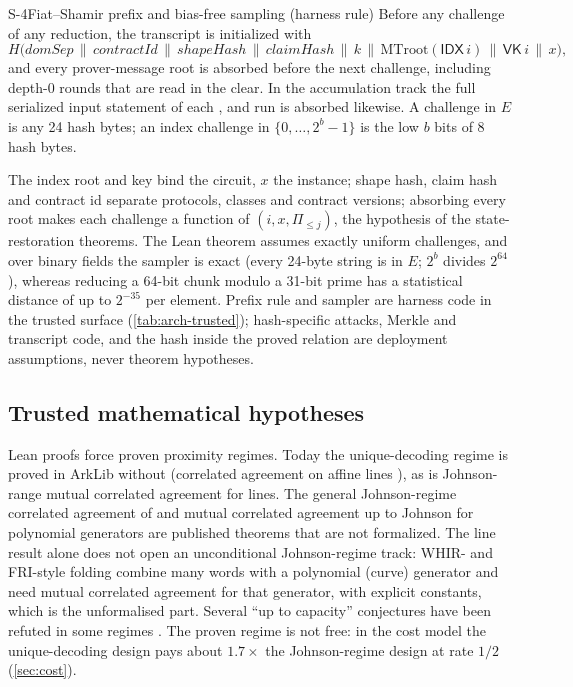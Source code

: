 \begin{decision}{S-4}{Fiat--Shamir prefix and bias-free sampling (harness rule)}
Before any challenge of any reduction, the transcript is initialized with
\[ H\bigl(\mathit{domSep}\,\|\,\mathit{contractId}\,\|\,\mathit{shapeHash}\,\|\,\mathit{claimHash}\,\|\,
   k\,\|\,\mathrm{MTroot}(\mathsf{IDX}\,i)\,\|\,\mathsf{VK}\,i\,\|\,x\bigr), \]
and every prover-message root is absorbed before the next challenge, including depth-0 rounds that
are read in the clear. In the accumulation track the full serialized input statement of each
,  and  run is absorbed likewise. A challenge in $E$ is any
24 hash bytes; an index challenge in $\{0,\dots,2^b-1\}$ is the low $b$ bits of 8 hash bytes.
\end{decision}

\noindent The index root and key bind the circuit, $x$ the instance; shape hash, claim hash and
contract id separate protocols, classes and contract versions; absorbing every root makes each
challenge a function of $(i,x,\Pi_{\le j})$, the hypothesis of the state-restoration theorems. The
Lean theorem assumes exactly uniform challenges, and over binary fields the sampler is exact (every
24-byte string is in $E$; $2^b$ divides $2^{64}$), whereas reducing a 64-bit chunk modulo a 31-bit
prime has a statistical distance of up to $2^{-35}$ per element. Prefix rule and sampler are harness code in the
trusted surface (\cref{tab:arch-trusted}); hash-specific attacks, Merkle and transcript code, and
the hash inside the proved relation are deployment assumptions, never theorem hypotheses.

\subsection{Trusted mathematical hypotheses}\label{subsec:sec-hypotheses}

Lean proofs force proven proximity regimes. Today the unique-decoding regime is proved in ArkLib
without  (correlated agreement on affine lines \cite{BCIKS20}), as is Johnson-range
mutual correlated agreement for lines. The general Johnson-regime correlated agreement of
\cite{BCIKS20,BCHKS25} and mutual correlated agreement up to Johnson for polynomial generators
\cite{BCGM25-MCA} are published theorems that are not formalized. The line result alone does not
open an unconditional Johnson-regime track: WHIR- and FRI-style folding combine many words with a
polynomial (curve) generator and need mutual correlated agreement for that generator, with explicit
constants, which is the unformalised part. Several \enquote{up to capacity}
conjectures have been refuted in some regimes \cite{DG25-Dist,CS25-PGC,BCHKS25,KKH26,Kam26}. The
proven regime is not free: in the cost model the unique-decoding design pays about $1.7\times$ the
Johnson-regime design at rate $1/2$ (\cref{sec:cost}).

